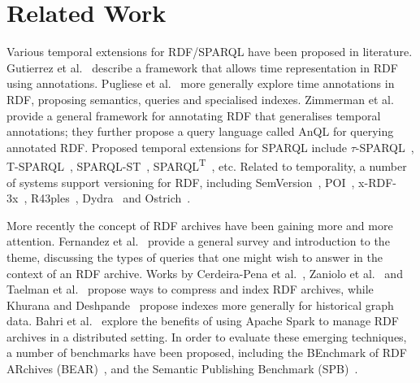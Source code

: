 \documentclass{llncs}
\begin{document}
\section{Related Work}

Various temporal extensions for RDF/SPARQL have been proposed in literature. Gutierrez et al.~\cite{GutierrezHV07} describe a framework that allows time representation in RDF using annotations. Pugliese et al.~\cite{PuglieseUS08} more generally explore time annotations in RDF, proposing semantics, queries and specialised indexes. Zimmerman et al.~\cite{ZimmermannLPS12} provide a general framework for annotating RDF that generalises temporal annotations; they further propose a query language called AnQL for querying annotated RDF. Proposed temporal extensions for SPARQL include $\tau$-SPARQL~\cite{TappoletB09}, T-SPARQL~\cite{Grandi10}, SPARQL-ST~\cite{PerryJS11}, SPARQL\textsuperscript{T}~\cite{ZanioloGACG18}, etc. Related to temporality, a number of systems support versioning for RDF, including SemVersion~\cite{VolkelG06}, POI~\cite{TzitzikasTA08}, x-RDF-3x~\cite{NeumannW10}, R43ples~\cite{GraubeHU14}, Dydra~\cite{AndersonB16} and Ostrich~\cite{TaelmanSV18}. 

More recently the concept of RDF archives have been gaining more and more attention. Fernandez et al.~\cite{FernandezPU15} provide a general survey and introduction to the theme, discussing the types of queries that one might wish to answer in the context of an RDF archive. Works by Cerdeira{-}Pena et al.~\cite{Cerdeira-PenaFF16}, Zaniolo et al.~\cite{ZanioloGACG18} and Taelman et al.~\cite{TaelmanSHMV19} propose ways to compress and index RDF archives, while Khurana and Deshpande~\cite{KhuranaD16} propose indexes more generally for historical graph data. Bahri et al.~\cite{BahriLA18} explore the benefits of using Apache Spark to manage RDF archives in a distributed setting. In order to evaluate these emerging techniques, a number of benchmarks have been proposed, including the BEnchmark of RDF
ARchives (BEAR)~\cite{FernandezUPK19}, and the Semantic Publishing Benchmark (SPB)~\cite{Papakonstantinou18}.
\end{document}
